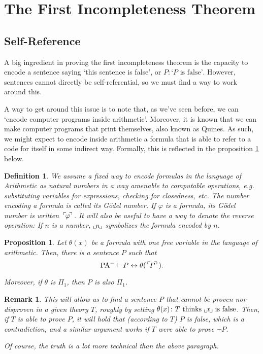 \documentclass{article}
\newtheorem{prop}[theorem]{Proposition}
\newtheorem{remark}[theorem]{Remark}
\newtheorem{definition}[theorem]{Definition}
\theoremstyle{nonumberplain}
\newcommand{\PA}{\mathrm{PA}}
\newcommand{\WPA}{\PA^-}
\newcommand{\gn}[1]{\setbox0=\hbox{$\mathclap{\phantom{t}}#1$} \dimen0=\ht0 \advance\dimen0 by -1.25ex \,\raise\dimen0\hbox{$\ulcorner$} \! \box0 \! \raise\dimen0\hbox{$\urcorner$}\,}
\newcommand{\gf}[1]{\raise-0.25ex\hbox{$\llcorner$}\! #1 \!\raise-0.25ex\hbox{$\lrcorner$}}
\begin{document}
\section{The First Incompleteness Theorem}

\subsection{Self-Reference}

A big ingredient in proving the first incompleteness theorem is the capacity to encode a sentence saying `this sentence is false', or $P \colon \text{`$P$ is false'}$. However, sentences cannot directly be self-referential, so we must find a way to work around this.

A way to get around this issue is to note that, as we've seen before, we can `encode computer programs inside arithmetic'. Moreover, it is known that we can make computer programs that print themselves, also known as Quines. As such, we might expect to encode inside arithmetic a formula that is able to refer to a code for itself in some indirect way. Formally, this is reflected in the proposition \ref{prop:selfref} below.

\begin{definition}
We assume a fixed way to encode formulas in the language of Arithmetic as natural numbers in a way amenable to computable operations, e.g. substituting variables for expressions, checking for closedness, etc. The number encoding a formula is called its \emph{Gödel number}. If $\varphi$ is a formula, its Gödel number is written $\gn\varphi$. It will also be useful to have a way to denote the reverse operation: If $n$ is a number, $\gf{n}$ symbolizes the formula encoded by $n$.
\end{definition}

\begin{prop}\label{prop:selfref}
Let $\theta(x)$ be a formula with one free variable in the language of arithmetic. Then, there is a sentence $P$ such that
\begin{equation}
\WPA \vdash P \leftrightarrow \theta(\gn P).
\end{equation}

Moreover, if $\theta$ is $\Pi_1$, then $P$ is also $\Pi_1$.
\end{prop}

\begin{remark}
This will allow us to find a sentence $P$ that cannot be proven nor disproven in a given theory $T$, roughly by setting $\theta(x) \colon \text{$T$ thinks $\gf x$ is false}$. Then, if $T$ is able to prove $P$, it will hold that (according to $T$) $P$ is false, which is a contradiction, and a similar argument works if $T$ were able to prove $\neg P$.

Of course, the truth is a lot more technical than the above paragraph.
\end{remark}
\end{document}

